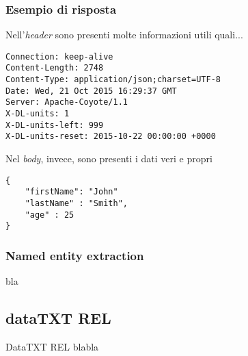         \subsubsection{Esempio di risposta}
		Nell'\emph{header} sono presenti molte informazioni utili quali...
		
		\begin{lstlisting}
Connection: keep-alive
Content-Length: 2748
Content-Type: application/json;charset=UTF-8
Date: Wed, 21 Oct 2015 16:29:37 GMT
Server: Apache-Coyote/1.1
X-DL-units: 1
X-DL-units-left: 999
X-DL-units-reset: 2015-10-22 00:00:00 +0000
		\end{lstlisting}
		Nel \emph{body}, invece, sono presenti i dati veri e propri
		\begin{lstlisting}
{     
    "firstName": "John"
    "lastName" : "Smith",
    "age" : 25
}
		\end{lstlisting}

	\subsubsection{Named entity extraction}
		bla
	

\subsection{dataTXT REL}
	DataTXT REL blabla